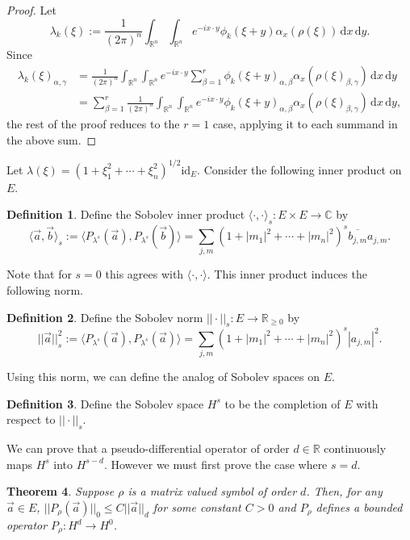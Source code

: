 \documentclass[10pt]{article}
\newtheorem{thm}{Theorem}[section]
\theoremstyle{remark}
\theoremstyle{definition}
\newtheorem{define}[thm]{Definition}
\begin{document}
\begin{proof}
Let $$\lambda_k(\xi):=\frac{1}{(2\pi)^n}\int_{\mathbb R^n}\!\int_{\mathbb R^n}\!
e^{-ix\cdot y}\phi_k(\xi+y)\alpha_x(\rho(\xi))\,\mathrm dx\,\mathrm dy.$$
Since
\begin{align*}
\lambda_k(\xi)_{\alpha,\gamma}
&= \frac{1}{(2\pi)^n}\int_{\mathbb R^n}\!\int_{\mathbb R^n}\!e^{-ix\cdot y}
\sum_{\beta=1}^r\phi_k(\xi+y)_{\alpha,\beta}\alpha_x(\rho(\xi)_{\beta,\gamma})
\,\mathrm dx\,\mathrm dy \\
&= \sum_{\beta=1}^r
\frac{1}{(2\pi)^n}\int_{\mathbb R^n}\!\int_{\mathbb R^n}\!e^{-ix\cdot y}
\phi_k(\xi+y)_{\alpha,\beta}\alpha_x(\rho(\xi)_{\beta,\gamma})
\,\mathrm dx\,\mathrm dy,
\end{align*}
the rest of the proof reduces to the $r=1$ case, applying it to each summand
in the above sum.
\end{proof}
Let $\lambda(\xi)=(1+\xi_1^2+\cdots+\xi_n^2)^{1/2}\mathrm{id}_E$.
Consider the following inner product on $E$.
\begin{define}
Define the Sobolev inner product
$\langle\cdot,\cdot\rangle_s:E\times E\rightarrow\mathbb C$ by
$$\langle\vec{a},\vec{b}\rangle_s:=
\langle P_{\lambda^s}(\vec{a}),P_{\lambda^s}(\vec{b})\rangle
=\sum_{j,m}(1+|m_1|^2+\cdots+|m_n|^2)^s\overline{b_{j,m}}a_{j,m}.$$
\end{define}
Note that for $s=0$ this agrees with
$\langle\cdot,\cdot\rangle$.
This inner product induces the following norm.
\begin{define}
Define the Sobolev norm $||\cdot||_s:E\rightarrow\mathbb R_{\ge 0}$ by
$$||\vec{a}||_s^2:=\langle P_{\lambda^s}(\vec{a}),P_{\lambda^s}(\vec{a})\rangle
=\sum_{j,m}(1+|m_1|^2+\cdots+|m_n|^2)^s|a_{j,m}|^2.$$
\end{define}
Using this norm, we can define the analog of Sobolev spaces on $E$.
\begin{define}
Define the Sobolev space $H^s$ to be the completion of $E$
with respect to $||\cdot||_s$.
\end{define}
We can prove that a pseudo-differential operator of order $d\in\mathbb R$
continuously maps $H^s$ into $H^{s-d}$. However we must first prove the case
where $s=d$.
\begin{thm}\label{ws4}
Suppose $\rho$ is a matrix valued symbol of order $d$.
Then, for any $\vec{a}\in E$, $||P_{\rho}(\vec{a})||_0\le C||\vec{a}||_d$ for
some constant $C>0$ and $P_{\rho}$ defines a bounded operator
$P_{\rho}:H^d\rightarrow H^0$.
\end{thm}
\end{document}
